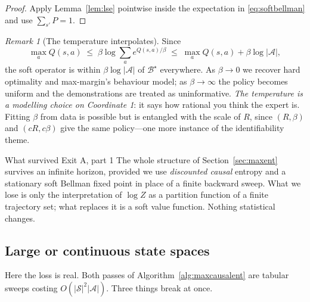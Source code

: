\documentclass[11pt]{article}
\theoremstyle{plain}
\theoremstyle{definition}
\theoremstyle{remark}
\newtheorem{remark}[theorem]{Remark}
\renewcommand{\S}{\mathcal{S}}
\newcommand{\A}{\mathcal{A}}
\begin{document}
\begin{proof}
Apply Lemma~\ref{lem:lse} pointwise inside the expectation in
\eqref{eq:softbellman} and use $\sum_{s'}P=1$.
\end{proof}

\begin{remark}[The temperature interpolates]
Since
\begin{equation*}
\max_a Q(s,a) \;\le\; \beta\log\sum_a e^{Q(s,a)/\beta} \;\le\; \max_a
Q(s,a) + \beta\log|\A|,
\end{equation*}
the soft operator is within $\beta\log|\A|$ of $\mathcal{B}^\star$
everywhere. As $\beta\to0$ we recover hard optimality and max-margin's
behaviour model; as $\beta\to\infty$ the policy becomes uniform and the
demonstrations are treated as uninformative. \emph{The temperature is a
modelling choice on Coordinate 1}: it says how rational you think the
expert is. Fitting $\beta$ from data is possible but is entangled with the
scale of $R$, since $(R,\beta)$ and $(cR,c\beta)$ give the same
policy---one more instance of the identifiability theme.
\end{remark}

\begin{graybox}{What survived Exit A, part 1}
The whole structure of Section~\ref{sec:maxent} survives an infinite
horizon, provided we use \emph{discounted causal} entropy and a stationary
soft Bellman fixed point in place of a finite backward sweep. What we lose
is only the interpretation of $\log Z$ as a partition function of a finite
trajectory set; what replaces it is a soft value function. Nothing
statistical changes.
\end{graybox}

\subsection{Large or continuous state spaces}

Here the loss is real. Both passes of Algorithm~\ref{alg:maxcausalent} are
tabular sweeps costing $O(|\S|^2|\A|)$. Three things break at once.
\end{document}
